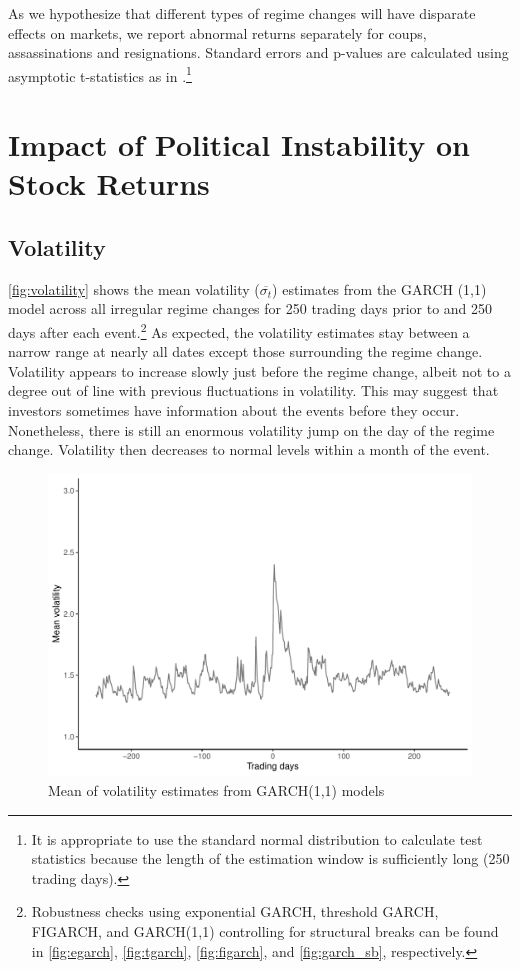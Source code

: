 \documentclass[12pt,final,fleqn]{article}
\theoremstyle{plain}
\begin{document}
As we hypothesize that different types of regime changes will have disparate effects on markets, we report abnormal returns separately for coups, assassinations and resignations. Standard errors and p-values are calculated using asymptotic t-statistics as in \citet{mackinlay1997event}.\footnote{It is appropriate to use the standard normal distribution to calculate test statistics because the length of the estimation window is sufficiently long (250 trading days).} 


\section{Impact of Political Instability on Stock Returns} \label{sec: Impact of Political Instability on Stock Returns}

\subsection{Volatility} \label{subsec: Volatility}


\autoref{fig:volatility} shows the mean volatility ($\overline{\sigma_t}$) estimates from the GARCH (1,1) model across all irregular regime changes for 250 trading days prior to and 250 days after each event.\footnote{Robustness checks using exponential GARCH, threshold GARCH, FIGARCH, and GARCH(1,1) controlling for structural breaks can be found in \autoref{fig:egarch}, \autoref{fig:tgarch}, \autoref{fig:figarch}, and \autoref{fig:garch_sb}, respectively.} As expected, the volatility estimates stay between a narrow range at nearly all dates except those surrounding the regime change. Volatility appears to increase slowly just before the regime change, albeit not to a degree out of line with previous fluctuations in volatility. This may suggest that investors sometimes have information about the events before they occur. Nonetheless, there is still an enormous volatility jump on the day of the regime change. Volatility then decreases to normal levels within a month of the event.

\begin{figure}[!htb]
\includegraphics[scale = 0.9]{../figs/mean-volatility.pdf}
\caption{Mean of volatility estimates from GARCH(1,1) models}
\label{fig:volatility}
\end{figure}
\end{document}
